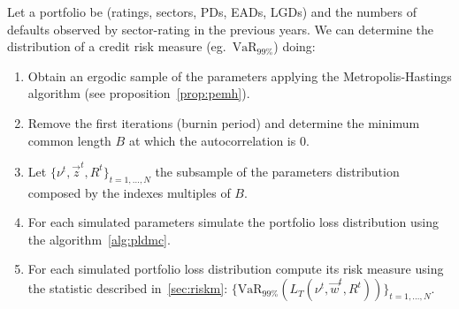 \documentclass[11pt,fleqn]{book} %
\begin{document}
\begin{algorithm}
	\label{alg:crmd}
	Let a portfolio be (ratings, sectors, PDs, EADs, LGDs) and the numbers 
	of defaults observed by sector-rating in the previous years. We can
	determine the distribution of a credit risk measure 
	(eg.\ $\text{VaR}_{99\%}$) doing:
	\begin{enumerate}
		\item Obtain an ergodic sample of the parameters applying the
		Metropolis-Hastings algorithm (see proposition~\ref{prop:pemh}).
		\item Remove the first iterations (burnin period) and determine
		the minimum common length $B$ at which the autocorrelation is $0$.
		\item Let $\{\nu^t, \vec{z}^t, R^t\}_{t=1,\dots,N}$ the subsample
		of the parameters distribution composed by the indexes multiples 
		of $B$.
		\item For each simulated parameters simulate the portfolio loss 
		distribution using the algorithm~\ref{alg:pldmc}.
		\item For each simulated portfolio loss distribution compute its 
		risk measure using the statistic described in~\ref{sec:riskm}:
		$\{\text{VaR}_{99\%}(L_T(\nu^t,\vec{w}^t,R^t))\}_{t=1,\dots,N}$.
	\end{enumerate}
\end{algorithm}
\end{document}
